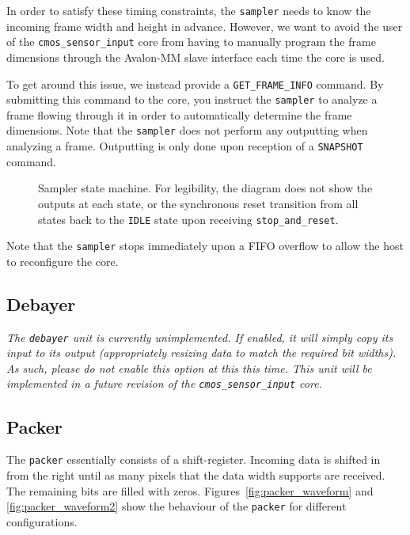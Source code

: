 \documentclass{article}
\def \cmossensorinput {\texttt{cmos\_sensor\_input} }
\begin{document}
In order to satisfy these timing constraints, the \texttt{sampler} needs to know the incoming frame width and height in advance. However, we want to avoid the user of the \cmossensorinput core from having to manually program the frame dimensions through the Avalon-MM slave interface each time the core is used.

To get around this issue, we instead provide a \texttt{GET\_FRAME\_INFO} command. By submitting this command to the core, you instruct the \texttt{sampler} to analyze a frame flowing through it in order to automatically determine the frame dimensions. Note that the \texttt{sampler} does not perform any outputting when analyzing a frame. Outputting is only done upon reception of a \texttt{SNAPSHOT} command.

\begin{figure}[h!]
    \centering
    \caption{Sampler state machine. For legibility, the diagram does not show the outputs at each state, or the synchronous reset transition from all states back to the \texttt{IDLE} state upon receiving \texttt{stop\_and\_reset}.}
    \label{fig:sampler_state_machine}
\end{figure}

Note that the \texttt{sampler} stops immediately upon a FIFO overflow to allow the host to reconfigure the core.

\newpage

\subsection{Debayer}
\emph{The \texttt{debayer} unit is currently unimplemented. If enabled, it will simply copy its input to its output (appropriately resizing data to match the required bit widths). As such, please do not enable this option at this this time. This unit will be implemented in a future revision of the \cmossensorinput core.}

\subsection{Packer}
The \texttt{packer} essentially consists of a shift-register. Incoming data is shifted in from the right until as many pixels that the data width supports are received. The remaining bits are filled with zeros. Figures~\ref{fig:packer_waveform} and \ref{fig:packer_waveform2} show the behaviour of the \texttt{packer} for different configurations.
\end{document}
